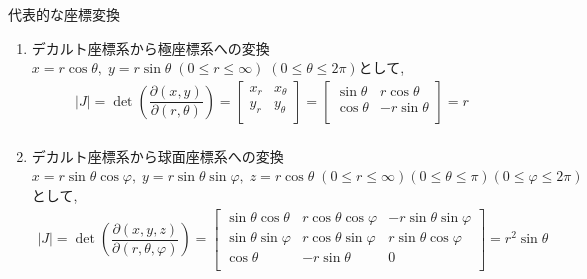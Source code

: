 \documentclass[a4paper]{jsarticle}
\begin{document}
\begin{itembox}[l]{代表的な座標変換}
    \begin{enumerate}[(1)]
        \item デカルト座標系から極座標系への変換\\
              $x=r\cos\theta,\; y=r\sin\theta\;\left(0\leq r\leq \infty\right)\;\left(0\leq \theta \leq 2\pi\right)$として,
              \begin{eqnarray*}
                  |J|=
                  \det\left(\dfrac{\partial\left(x,y\right)}{\partial\left(r,\theta\right)}\right)
                  =
                  \begin{bmatrix}
                      x_r & x_\theta \\
                      y_r & y_\theta \\
                  \end{bmatrix}
                  =
                  \begin{bmatrix}
                      \sin\theta & r\cos\theta  \\
                      \cos\theta & -r\sin\theta \\
                  \end{bmatrix}
                  =r\\
              \end{eqnarray*}
        \item デカルト座標系から球面座標系への変換\\
              $x=r\sin\theta\cos\varphi,\; y=r\sin\theta\sin\varphi,\; z=r\cos\theta\;\left(0\leq r\leq\infty\right)\left(0\leq\theta\leq\pi\right)\left(0\leq\varphi\leq 2\pi\right)$として,
              \begin{eqnarray*}
                  |J|
                  =
                  \det\left(\dfrac{\partial \left(x,y,z\right)}{\partial \left(r,\theta,\varphi\right)}\right)
                  =
                  \begin{bmatrix}
                      \sin\theta\cos\theta  & r\cos\theta\cos\varphi & -r\sin\theta\sin\varphi \\
                      \sin\theta\sin\varphi & r\cos\theta\sin\varphi & r\sin\theta\cos\varphi  \\
                      \cos\theta            & -r\sin\theta           & 0                       \\
                  \end{bmatrix}
                  =r^2\sin\theta
              \end{eqnarray*}
    \end{enumerate}
\end{itembox}
\newpage
\end{document}
